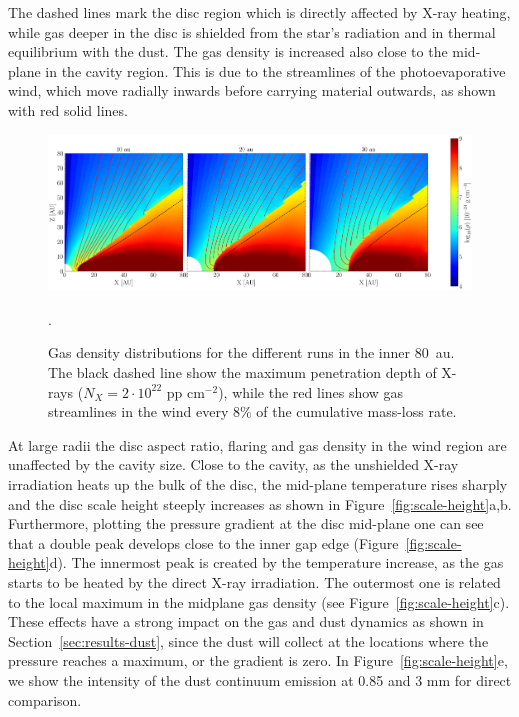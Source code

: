 \documentclass[fleqn,usenatbib]{mnras}
\begin{document}
        The dashed lines mark the disc region which is directly affected by X-ray heating, while gas deeper in the disc is shielded from the star's radiation and in thermal equilibrium with the dust.
        The gas density is increased also close to the mid-plane in the cavity region. 
        This is due to the streamlines of the photoevaporative wind, which move radially inwards before carrying material outwards, as shown with red solid lines.
        \begin{figure}
            \centering
            \includegraphics[width=\textwidth]{Fig1}
            \caption{Gas density distributions for the different runs in the inner \SI{80}{au}. The black dashed line show the maximum penetration depth of X-rays ($N_X = 2\cdot 10^{22}$ pp cm$^{-2}$), while the red lines show gas streamlines in the wind every $8\%$ of the cumulative mass-loss rate.}.
            \label{fig:GasDist}
        \end{figure}
        At large radii the disc aspect ratio, flaring and gas density in the wind region are unaffected by the cavity size.
        Close to the cavity, as the unshielded X-ray irradiation heats up the bulk of the disc, the mid-plane temperature rises sharply and the disc scale height steeply increases as shown in Figure~\ref{fig:scale-height}a,b. Furthermore, plotting the pressure gradient at the disc mid-plane one can see that a double peak develops close to the inner gap edge (Figure~\ref{fig:scale-height}d).
        The innermost peak is created by the temperature increase, as the gas starts to be heated by the direct X-ray irradiation. The outermost one is related to the local maximum in the midplane gas density (see Figure~\ref{fig:scale-height}c).
        These effects have a strong impact on the gas and dust dynamics as shown in Section~\ref{sec:results-dust}, since the dust will collect at the locations where the pressure reaches a maximum, or the gradient is zero. In Figure~\ref{fig:scale-height}e, we show the intensity of the dust continuum emission at 0.85 and 3 mm for direct comparison.
        
\end{document}
